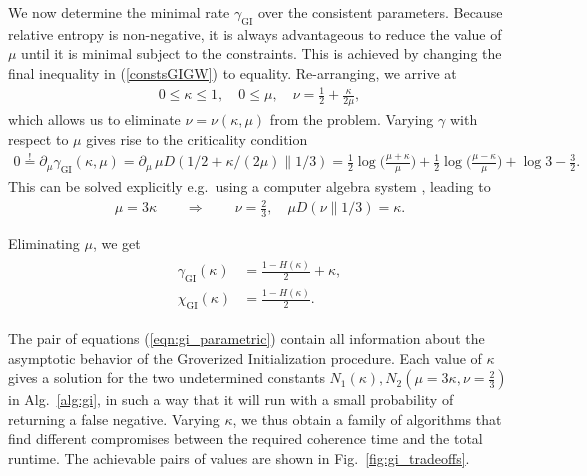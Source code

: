 \documentclass[a4paper,aps,floatfix]{revtex4}
\begin{document}
We now determine the minimal rate $\gamma_{\mathrm{GI}}$ over the consistent parameters.
Because relative entropy is non-negative, it is always advantageous to reduce the value of $\mu$ until it is minimal subject to the constraints.
This is achieved by changing the final inequality in (\ref{constsGIGW}) to equality.
Re-arranging, we arrive at
\begin{equation}
	\label{constsGIGW2}
	\begin{aligned}
			0 \le \kappa \le 1,
			\quad
			0 \leq \mu,
			\quad
           \nu = \frac12+\frac{\kappa}{2\mu},
	\end{aligned}
\end{equation}
which allows us to eliminate $\nu=\nu(\kappa,\mu)$ from the problem.
Varying $\gamma$ with respect to $\mu$ gives rise to the criticality condition
\begin{align}
	0
	\stackrel{!}{=}
	\partial_\mu \gamma_{\textrm{GI}}(\kappa,\mu)
	= 
	\partial_\mu \,\mu D(1/2+\kappa/(2\mu) \parallel 1/3)
	=
	\frac12\log\Big(\frac{\mu+\kappa}{\mu}\Big) +\frac12\log\Big(\frac{\mu-\kappa}{\mu}\Big)+\log3-\frac32.
		\label{partialv} 
\end{align}
This can be solved explicitly e.g.\ using a computer algebra system \cite{our-data}, leading to
\begin{align}\label{eqn:mu_nu}
	\mu = 3\kappa
	\qquad\Rightarrow\qquad
	\nu=\frac23,
	\quad
	\mu D(\nu \parallel 1/3) = \kappa.
\end{align}

Eliminating $\mu$, we get
\begin{align}\label{eqn:gi_parametric}
	\begin{split} 
		\gamma_{\textrm{GI}}(\kappa)
		&=
		\frac{1-H(\kappa)}2 + \kappa, \\
		\chi_{\mathrm{GI}}(\kappa)
		&=
		\frac{1-H(\kappa)}2.
	\end{split}
\end{align}

The pair of equations (\ref{eqn:gi_parametric}) contain all information about the asymptotic behavior of the Groverized Initialization procedure.
Each value of $\kappa$ gives a solution for the two undetermined constants $N_1(\kappa), N_2(\mu=3\kappa, \nu=\frac23)$ in Alg.~\ref{alg:gi}, in such a way that it will run with a small probability of returning a false negative.
Varying $\kappa$, we thus obtain a family of algorithms that find different compromises between the required coherence time and the total runtime. 
The achievable pairs of values are shown in Fig.~\ref{fig:gi_tradeoffs}.
\end{document}
